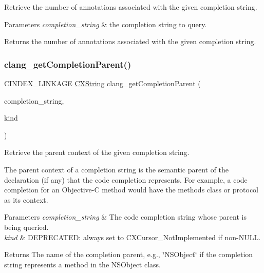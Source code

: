 Retrieve the number of annotations associated with the given completion string. 


\begin{DoxyParams}{Parameters}
{\em completion\+\_\+string} & the completion string to query.\\
\hline
\end{DoxyParams}
\begin{DoxyReturn}{Returns}
the number of annotations associated with the given completion string. 
\end{DoxyReturn}
\mbox{\label{group__CINDEX__CODE__COMPLET_ga8afa885ca6547c96baa1369179b3b236}} 
\subsubsection{\texorpdfstring{clang\+\_\+get\+Completion\+Parent()}{clang\_getCompletionParent()}}
{\footnotesize\ttfamily C\+I\+N\+D\+E\+X\+\_\+\+L\+I\+N\+K\+A\+GE \hyperlink{structCXString}{C\+X\+String} clang\+\_\+get\+Completion\+Parent (\begin{DoxyParamCaption}\item[{\hyperlink{group__CINDEX__CODE__COMPLET_gafea23a43a60ec3b4f3bedccfbb76883a}{C\+X\+Completion\+String}}]{completion\+\_\+string,  }\item[{enum \hyperlink{group__CINDEX_gaaccc432245b4cd9f2d470913f9ef0013}{C\+X\+Cursor\+Kind} $\ast$}]{kind }\end{DoxyParamCaption})}



Retrieve the parent context of the given completion string. 

The parent context of a completion string is the semantic parent of the declaration (if any) that the code completion represents. For example, a code completion for an Objective-\/C method would have the method\textquotesingle{}s class or protocol as its context.


\begin{DoxyParams}{Parameters}
{\em completion\+\_\+string} & The code completion string whose parent is being queried.\\
\hline
{\em kind} & D\+E\+P\+R\+E\+C\+A\+T\+ED\+: always set to C\+X\+Cursor\+\_\+\+Not\+Implemented if non-\/\+N\+U\+LL.\\
\hline
\end{DoxyParams}
\begin{DoxyReturn}{Returns}
The name of the completion parent, e.\+g., \char`\"{}\+N\+S\+Object\char`\"{} if the completion string represents a method in the N\+S\+Object class. 
\end{DoxyReturn}
\mbox{\label{group__CINDEX__CODE__COMPLET_ga46e843acdf63d9a7a0c7341a2d222c49}} 
